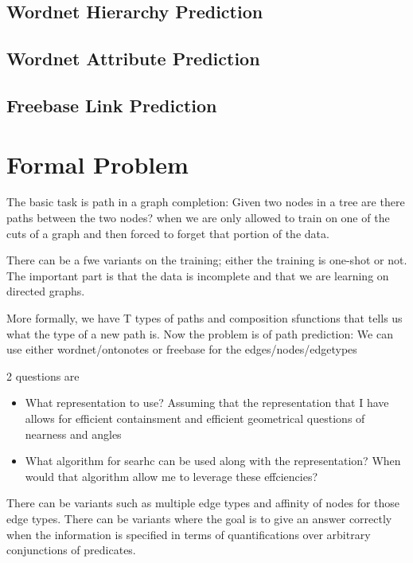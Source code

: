 \documentclass[11pt]{article}
\begin{document}
\subsection{Wordnet Hierarchy Prediction}
\label{sec:wordn-hier-pred}


\subsection{Wordnet Attribute Prediction}
\label{sec:wordn-attr-pred}



\subsection{Freebase Link Prediction}
\label{sec:freeb-link-pred}

\section{Formal Problem}
\label{sec:formal-problem}
The basic task is path in a graph completion: Given two nodes in a
tree are there paths between the two nodes? when we are only allowed
to train on one of the cuts of a graph and then forced to forget that
portion of the data.

There can be a fwe variants on the training; either the training is
one-shot or not. The important part is that the data is incomplete and
that we are learning on directed graphs.

More formally, we have T types of paths and composition sfunctions
that tells us what the type of a new path is. Now the problem is of
path prediction: We can use either wordnet/ontonotes or freebase for
the edges/nodes/edgetypes

2 questions are
\begin{itemize}
\item What representation to use? Assuming that the representation
  that I have allows for efficient containsment and efficient
  geometrical questions of nearness and angles
\item What algorithm for searhc can be used along with the
  representation? When would that algorithm allow me to leverage these effciencies?
\end{itemize}

There can be variants such as multiple edge types and affinity of
nodes for those edge types. There can be variants where the goal is to
give an answer correctly when the information is specified in terms of
quantifications over arbitrary conjunctions of predicates.
\end{document}
